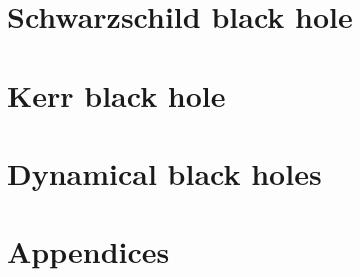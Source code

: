 \documentclass[12pt,a4paper]{book}
\begin{document}
\part{Schwarzschild black hole} \label{P:sch}





\part{Kerr black hole} \label{P:ker}





\part{Dynamical black holes}







\appendix

\part{Appendices}
\end{document}
